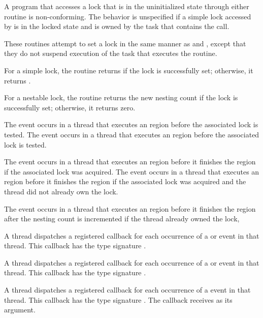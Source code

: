 \constraints
A program that accesses a lock that is in the uninitialized state 
through either routine is non-conforming. The behavior is unspecified 
if a simple lock accessed by  is in the locked state 
and is owned by the task that contains the call.

\effect
These routines attempt to set a lock in the same manner as  
and , except that they do not suspend execution of the 
task that executes the routine.

For a simple lock, the  routine returns  if 
the lock is successfully set; otherwise, it returns .

For a nestable lock, the  routine returns the 
new nesting count if the lock is successfully set; otherwise, it returns zero.

\events
The  event occurs in a thread that executes an 
 region before the associated lock is tested.
The  event occurs in a thread that executes 
an  region before the associated lock is tested.

The  event occurs in a thread that executes an 
 region before it finishes the region if the associated 
lock was acquired. The  event occurs in a 
thread that executes an  region before it finishes
the region if the associated lock was acquired and the thread did not already 
own the lock.

The  event occurs in a thread that executes an 
 region before it finishes the region after 
the nesting count is incremented if the thread already owned the lock,

\tools
A thread dispatches a registered 
callback for each occurrence of a  or  event
in that thread.  This callback has the type signature .

A thread dispatches a registered 
callback for each occurrence of a  or  event
in that thread.  This callback has the type signature .

A thread dispatches a registered 
callback for each occurrence of a  event
in that thread. This callback has the type signature .
The callback receives  as its  argument.

